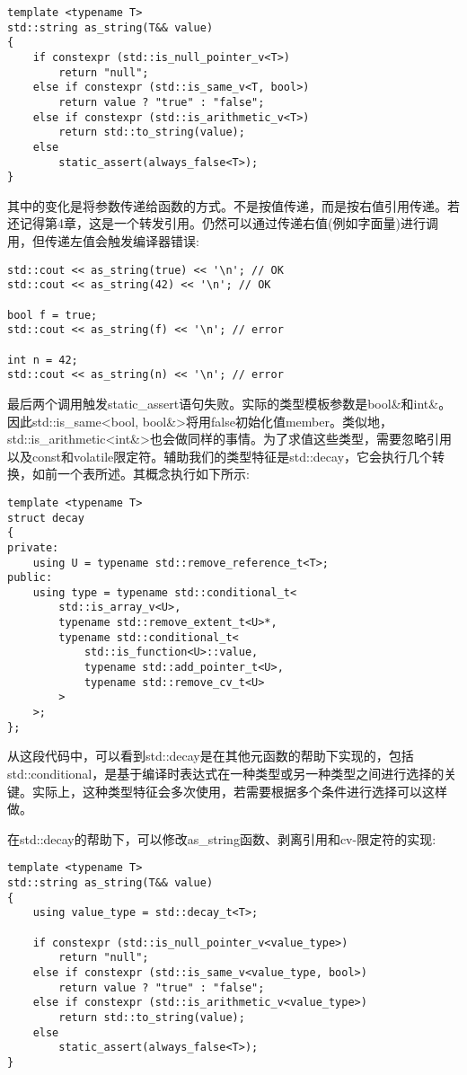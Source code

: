 \begin{lstlisting}[style=styleCXX]
template <typename T>
std::string as_string(T&& value)
{
	if constexpr (std::is_null_pointer_v<T>)
		return "null";
	else if constexpr (std::is_same_v<T, bool>)
		return value ? "true" : "false";
	else if constexpr (std::is_arithmetic_v<T>)
		return std::to_string(value);
	else
		static_assert(always_false<T>);
}
\end{lstlisting}

其中的变化是将参数传递给函数的方式。不是按值传递，而是按右值引用传递。若还记得第4章，这是一个转发引用。仍然可以通过传递右值(例如字面量)进行调用，但传递左值会触发编译器错误:

\begin{lstlisting}[style=styleCXX]
std::cout << as_string(true) << '\n'; // OK
std::cout << as_string(42) << '\n'; // OK

bool f = true;
std::cout << as_string(f) << '\n'; // error

int n = 42;
std::cout << as_string(n) << '\n'; // error
\end{lstlisting}

最后两个调用触发static\_assert语句失败。实际的类型模板参数是bool\&和int\&。因此std::is\_same<bool, bool\&>将用false初始化值member。类似地，std::is\_arithmetic<int\&>也会做同样的事情。为了求值这些类型，需要忽略引用以及const和volatile限定符。辅助我们的类型特征是std::decay，它会执行几个转换，如前一个表所述。其概念执行如下所示:

\begin{lstlisting}[style=styleCXX]
template <typename T>
struct decay
{
private:
	using U = typename std::remove_reference_t<T>;
public:
	using type = typename std::conditional_t<
		std::is_array_v<U>,
		typename std::remove_extent_t<U>*,
		typename std::conditional_t<
			std::is_function<U>::value,
			typename std::add_pointer_t<U>,
			typename std::remove_cv_t<U>
		>
	>;
};
\end{lstlisting}

从这段代码中，可以看到std::decay是在其他元函数的帮助下实现的，包括std::conditional，是基于编译时表达式在一种类型或另一种类型之间进行选择的关键。实际上，这种类型特征会多次使用，若需要根据多个条件进行选择可以这样做。

在std::decay的帮助下，可以修改as\_string函数、剥离引用和cv-限定符的实现:

\begin{lstlisting}[style=styleCXX]
template <typename T>
std::string as_string(T&& value)
{
	using value_type = std::decay_t<T>;
	
	if constexpr (std::is_null_pointer_v<value_type>)
		return "null";
	else if constexpr (std::is_same_v<value_type, bool>)
		return value ? "true" : "false";
	else if constexpr (std::is_arithmetic_v<value_type>)
		return std::to_string(value);
	else
		static_assert(always_false<T>);
}
\end{lstlisting}

